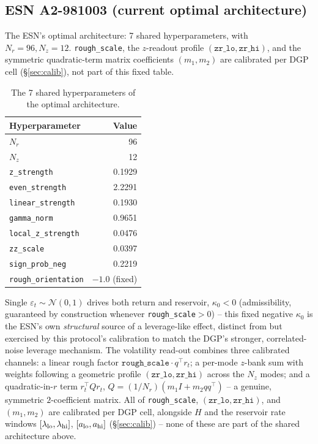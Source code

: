 \documentclass[11pt,a4paper]{article}
\begin{document}
\subsection{ESN A2-981003 (current optimal architecture)}
The ESN's optimal architecture: 7 shared hyperparameters, with
$N_r=96,N_z=12$. \texttt{rough\_scale}, the $z$-readout profile
$(\texttt{zr\_lo},\texttt{zr\_hi})$, and the symmetric quadratic-term
matrix coefficients $(m_1,m_2)$ are calibrated per DGP cell
(\S\ref{sec:calib}), not part of this fixed table.
\begin{table}[h]
\centering
\caption{The 7 shared hyperparameters of the optimal architecture.}
\label{tab:optarch}
\begin{tabular}{@{}lr@{}}
\toprule
Hyperparameter & Value \\
\midrule
$N_r$ & 96 \\
$N_z$ & 12 \\
\texttt{z\_strength} & 0.1929 \\
\texttt{even\_strength} & 2.2291 \\
\texttt{linear\_strength} & 0.1930 \\
\texttt{gamma\_norm} & 0.9651 \\
\texttt{local\_z\_strength} & 0.0476 \\
\texttt{zz\_scale} & 0.0397 \\
\texttt{sign\_prob\_neg} & 0.2219 \\
\texttt{rough\_orientation} & $-1.0$ (fixed) \\
\bottomrule
\end{tabular}
\end{table}
Single $\varepsilon_t\sim\mathcal{N}(0,1)$ drives both return and
reservoir, $\kappa_0<0$ (admissibility, guaranteed by construction
whenever \texttt{rough\_scale}$>0$) -- this fixed negative $\kappa_0$
is the ESN's own \emph{structural} source of a leverage-like effect,
distinct from but exercised by this protocol's calibration to match
the DGP's stronger, correlated-noise leverage mechanism. The volatility
read-out combines three calibrated channels: a linear rough factor
$\texttt{rough\_scale}\cdot q^\top r_t$; a per-mode $z$-bank sum with
weights following a geometric profile
$(\texttt{zr\_lo},\texttt{zr\_hi})$ across the $N_z$ modes; and a
quadratic-in-$r$ term $r_t^\top Qr_t$, $Q=(1/N_r)(m_1I+m_2qq^\top)$ --
a genuine, symmetric $2$-coefficient matrix. All of
\texttt{rough\_scale}, $(\texttt{zr\_lo},\texttt{zr\_hi})$, and
$(m_1,m_2)$ are calibrated per DGP cell, alongside $H$ and the
reservoir rate windows $[\lambda_{\rm lo},\lambda_{\rm hi}]$,
$[a_{\rm lo},a_{\rm hi}]$ (\S\ref{sec:calib}) -- none of these are part
of the shared architecture above.
\end{document}
